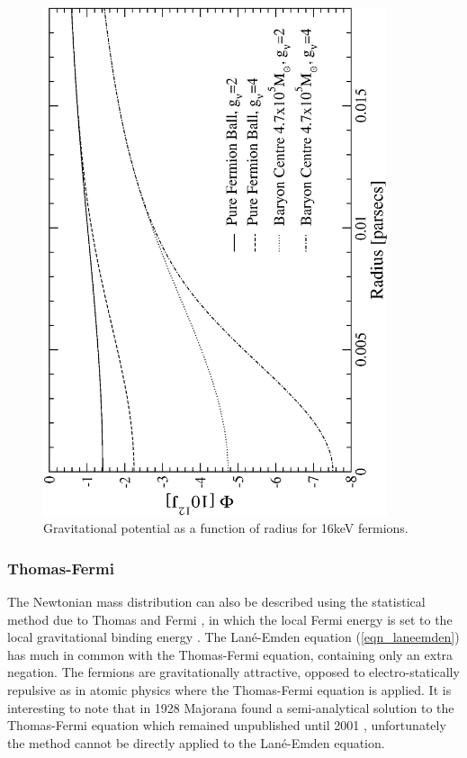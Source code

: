 \begin{figure}[p]
	\begin{center}
	\includegraphics[angle=-90,width=0.9\textwidth]{eps/classicalpotential.eps}
	\caption{Gravitational potential as a function of radius for 16keV fermions.}
	\label{fig_classicalpotential}
	\end{center}
\end{figure}
\subsubsection{Thomas-Fermi}
The Newtonian mass distribution can also be described using the statistical method due to Thomas and Fermi
\cite{ref_thomasfermi}, in which the local Fermi energy is set to the local gravitational binding energy \cite{ref_thomasfermiapproach}.
The Lan\'e-Emden equation (\ref{eqn_laneemden}) has much in common with the Thomas-Fermi equation, containing only an extra negation. The
fermions are gravitationally attractive, opposed to electro-statically repulsive as in atomic physics where the Thomas-Fermi equation is
applied. It is interesting to note that in 1928 Majorana found a semi-analytical solution to the Thomas-Fermi equation which remained
unpublished until 2001 \cite{ref_majoranasolution}, unfortunately the method cannot be directly applied to the Lan\'e-Emden equation.

